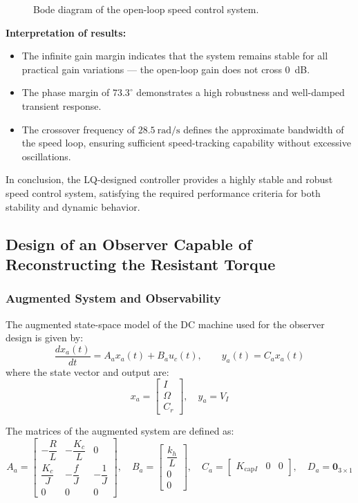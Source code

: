 \documentclass{rapportCS}
\begin{document}
\begin{figure}[H]
    \centering
    \caption{Bode diagram of the open-loop speed control system.}
    \label{fig:bode_speed_loop}
\end{figure}

\noindent\textbf{Interpretation of results:}
\begin{itemize}
    \item The infinite gain margin indicates that the system remains stable for all practical gain variations — the open-loop gain does not cross 0~dB.
    \item The phase margin of $73.3^{\circ}$ demonstrates a high robustness and well-damped transient response.
    \item The crossover frequency of $28.5~\mathrm{rad/s}$ defines the approximate bandwidth of the speed loop, ensuring sufficient speed-tracking capability without excessive oscillations.
\end{itemize}

In conclusion, the LQ-designed controller provides a highly stable and robust speed control system, satisfying the required performance criteria for both stability and dynamic behavior.

\subsection{Design of an Observer Capable of Reconstructing the Resistant Torque}
\subsubsection{Augmented System and Observability}

The augmented state-space model of the DC machine used for the observer design is given by:
\begin{equation*}
\frac{d x_a(t)}{dt} = A_a x_a(t) + B_a u_c(t), \qquad y_a(t) = C_a x_a(t)
\end{equation*}
where the state vector and output are:
\[
x_a = 
\begin{bmatrix}
I \\[4pt] \Omega \\[4pt] C_r
\end{bmatrix}, 
\quad
y_a = V_I
\]

The matrices of the augmented system are defined as:
\begin{equation*}
A_a = 
\begin{bmatrix}
-\dfrac{R}{L} & -\dfrac{K_c}{L} & 0 \\[6pt]
\dfrac{K_c}{J} & -\dfrac{f}{J} & -\dfrac{1}{J} \\[6pt]
0 & 0 & 0
\end{bmatrix},
\quad
B_a =
\begin{bmatrix}
\dfrac{k_h}{L} \\[4pt] 0 \\[4pt] 0
\end{bmatrix},
\quad
C_a = 
\begin{bmatrix}
K_{\mathrm{cap}I} & 0 & 0
\end{bmatrix},
\quad
D_a = \mathbf{0}_{3\times1}
\end{equation*}
\end{document}
